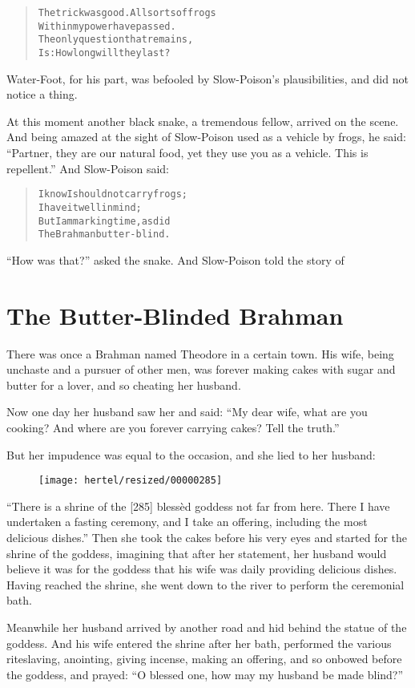 \documentclass[article, twoside, 10pt]{memoir}
\renewenvironment{verbatim}{%
\begin{quote}%
\vskip -10pt%
\begin{alltt}\normalfont\small}{\end{alltt}%
\end{quote}%
\vskip -10pt
} %
\begin{document}
\begin{verbatim}
The trick was good. All sorts of frogs
    Within my power have passed.
The only question that remains,
    Is: How long will they last?
\end{verbatim}
Water-Foot, for his part, was befooled by Slow-Poison's
plausibilities, and did not notice a thing.

At this moment another black snake, a tremendous fellow, arrived on
the scene. And being amazed at the sight of Slow-Poison used as a
vehicle by frogs, he said:
``Partner, they are our natural food, yet they use you as a vehicle. This is repellent.''
And Slow-Poison said:

\begin{verbatim}
I know I should not carry frogs;
    I have it well in mind;
But I am marking time, as did
    The Brahman butter-blind.
\end{verbatim}
``How was that?'' asked the snake. And Slow-Poison told the story
of

\chapter{The Butter-Blinded Brahman}

There was once a Brahman named Theodore in a certain town. His
wife, being unchaste and a pursuer of other men, was forever making
cakes with sugar and butter for a lover, and so cheating her
husband.

Now one day her husband saw her and said:
``My dear wife, what are you cooking? And where are you forever carrying cakes? Tell the truth.''

But her impudence was equal to the occasion, and she lied to her
husband:
\begin{figure}[p]\texttt{[image: hertel/resized/00000285]}\end{figure}``There is a shrine of the [285] blessèd goddess not far from here. There I have undertaken a fasting ceremony, and I take an offering, including the most delicious dishes.''
Then she took the cakes before his very eyes and started for the
shrine of the goddess, imagining that after her statement, her
husband would believe it was for the goddess that his wife was
daily providing delicious dishes. Having reached the shrine, she
went down to the river to perform the ceremonial bath.

Meanwhile her husband arrived by another road and hid behind the
statue of the goddess. And his wife entered the shrine after her
bath, performed the various rites{\textemdash}laving, anointing, giving
incense, making an offering, and so on{\textemdash}bowed before the goddess,
and prayed: ``O blessed one, how may my husband be made blind?''
\end{document}
